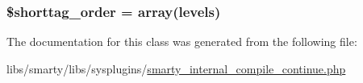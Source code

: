 \subsubsection[{\$shorttag\+\_\+order}]{\setlength{\rightskip}{0pt plus 5cm}\$shorttag\+\_\+order = array(\textquotesingle{}levels\textquotesingle{})}\label{class_smarty___internal___compile___continue_a2ccb25269c3a92e8c4796c7ef23725e6}


The documentation for this class was generated from the following file\+:\begin{DoxyCompactItemize}
\item 
libs/smarty/libs/sysplugins/\hyperlink{smarty__internal__compile__continue_8php}{smarty\+\_\+internal\+\_\+compile\+\_\+continue.\+php}\end{DoxyCompactItemize}

